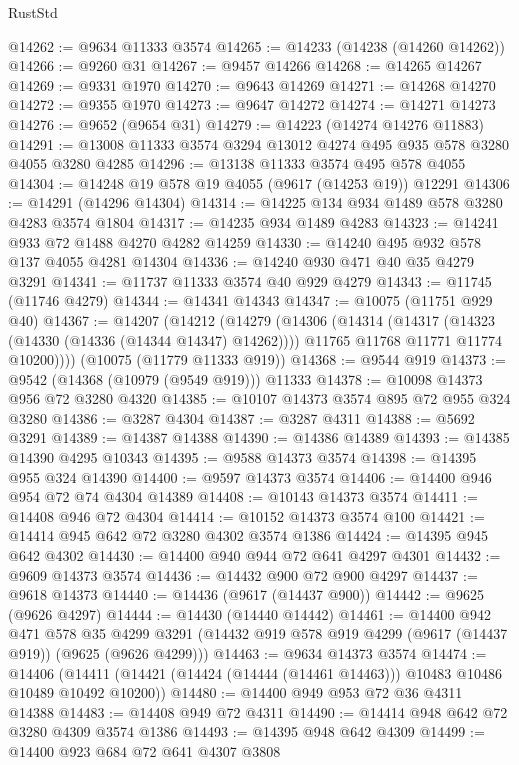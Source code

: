 \begin{lexlean}{RustStd}
\begin{coremodule}
{\begin{coremodule}
{{{{{{{{{{{{{{{{{{{{{{{{{{{{{{{{{@14262 := @9634 @11333 @3574
@14265 := @14233 (@14238 (@14260 @14262))
@14266 := @9260 @31
@14267 := @9457 @14266
@14268 := @14265 @14267
@14269 := @9331 @1970
@14270 := @9643 @14269
@14271 := @14268 @14270
@14272 := @9355 @1970
@14273 := @9647 @14272
@14274 := @14271 @14273
@14276 := @9652 (@9654 @31)
@14279 := @14223 (@14274 @14276 @11883)
@14291 := @13008 @11333 @3574 @3294 @13012 @4274 @495 @935 @578 @3280 @4055 @3280 @4285
@14296 := @13138 @11333 @3574 @495 @578 @4055
@14304 := @14248 @19 @578 @19 @4055 (@9617 (@14253 @19)) @12291
@14306 := @14291 (@14296 @14304)
@14314 := @14225 @134 @934 @1489 @578 @3280 @4283 @3574 @1804
@14317 := @14235 @934 @1489 @4283
@14323 := @14241 @933 @72 @1488 @4270 @4282 @14259
@14330 := @14240 @495 @932 @578 @137 @4055 @4281 @14304
@14336 := @14240 @930 @471 @40 @35 @4279 @3291
@14341 := @11737 @11333 @3574 @40 @929 @4279
@14343 := @11745 (@11746 @4279)
@14344 := @14341 @14343
@14347 := @10075 (@11751 @929 @40)
@14367 := @14207
    (@14212
      (@14279
        (@14306
          (@14314
            (@14317 (@14323 (@14330 (@14336 (@14344 @14347) @14262))))
            @11765
            @11768
            @11771
            @11774
            @10200))))
    (@10075 (@11779 @11333 @919))
@14368 := @9544 @919
@14373 := @9542 (@14368 (@10979 (@9549 @919))) @11333
@14378 := @10098 @14373 @956 @72 @3280 @4320
@14385 := @10107 @14373 @3574 @895 @72 @955 @324 @3280
@14386 := @3287 @4304
@14387 := @3287 @4311
@14388 := @5692 @3291
@14389 := @14387 @14388
@14390 := @14386 @14389
@14393 := @14385 @14390 @4295 @10343
@14395 := @9588 @14373 @3574
@14398 := @14395 @955 @324 @14390
@14400 := @9597 @14373 @3574
@14406 := @14400 @946 @954 @72 @74 @4304 @14389
@14408 := @10143 @14373 @3574
@14411 := @14408 @946 @72 @4304
@14414 := @10152 @14373 @3574 @100
@14421 := @14414 @945 @642 @72 @3280 @4302 @3574 @1386
@14424 := @14395 @945 @642 @4302
@14430 := @14400 @940 @944 @72 @641 @4297 @4301
@14432 := @9609 @14373 @3574
@14436 := @14432 @900 @72 @900 @4297
@14437 := @9618 @14373
@14440 := @14436 (@9617 (@14437 @900))
@14442 := @9625 (@9626 @4297)
@14444 := @14430 (@14440 @14442)
@14461 := @14400
    @942
    @471
    @578
    @35
    @4299
    @3291
    (@14432 @919 @578 @919 @4299 (@9617 (@14437 @919)) (@9625 (@9626 @4299)))
@14463 := @9634 @14373 @3574
@14474 := @14406
    (@14411 (@14421 (@14424 (@14444 (@14461 @14463))) @10483 @10486 @10489 @10492 @10200))
@14480 := @14400 @949 @953 @72 @36 @4311 @14388
@14483 := @14408 @949 @72 @4311
@14490 := @14414 @948 @642 @72 @3280 @4309 @3574 @1386
@14493 := @14395 @948 @642 @4309
@14499 := @14400 @923 @684 @72 @641 @4307 @3808
}}}}}}}}}}}}}}}}}}}}}}}}}}}}}}}}}
\end{coremodule}}
\end{coremodule}
\end{lexlean}
